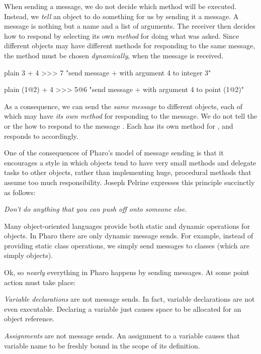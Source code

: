 \documentclass[10pt,twoside,english]{_support/latex/sbabook/sbabook}
\begin{document}
When sending a message, we do not decide which method will be executed. Instead,
we \textit{tell} an object to do something for us by sending it a message. A message
is nothing but a name and a list of arguments. The receiver then decides how to
respond by selecting its own \textit{method} for doing what was asked. Since
different objects may have different methods for responding to the same message,
the method must be chosen \textit{dynamically}, when the message is received.

\begin{displaycode}{plain}
3 + 4
>>> 7          "send message + with argument 4 to integer 3"
\end{displaycode}

\begin{displaycode}{plain}
(1@2) + 4
>>> 5@6    "send message + with argument 4 to point (1@2)"
\end{displaycode}

As a consequence, we can send the \textit{same message} to different objects, each of
which may have \textit{its own method} for responding to the message. We do not tell
the   or the   how to respond to the
message . Each has its own method for \textcode{+}, and responds to 
accordingly.

One of the consequences of Pharo's model of message sending is that it
encourages a style in which objects tend to have very small methods and delegate
tasks to other objects, rather than implementing huge, procedural methods that
assume too much responsibility. Joseph Pelrine expresses this principle
succinctly as follows:

\textit{Don't do anything that you can push off onto someone else.}

Many object-oriented languages provide both static and dynamic operations for
objects. In Pharo there are only dynamic message sends. For example, instead of
providing static class operations, we simply send messages to classes (which
are simply objects).

Ok, so \textit{nearly} everything in Pharo happens by sending messages. At some point
action must take place:

\textit{Variable declarations} are not message sends. In fact, variable declarations
are not even executable. Declaring a variable just causes space to be allocated
for an object reference.

\textit{Assignments} are not message sends. An assignment to a variable causes that
variable name to be freshly bound in the scope of its definition.
\end{document}
